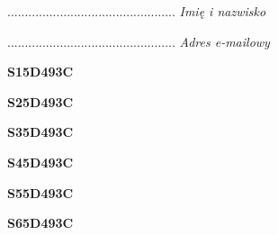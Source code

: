 \begin{turn}{90}\begin{minipage}{\linewidth} \vspace{20mm} ................................................  \textit{Imię i nazwisko}\end{minipage}\end{turn}

\begin{turn}{90}\begin{minipage}{\linewidth} \vspace{20mm} ................................................  \textit{Adres e-mailowy}\end{minipage}\end{turn}

\begin{turn}{90}\huge \begin{minipage}{\linewidth} \vspace{10mm}\textbf{S15D493C}\end{minipage}\end{turn}

\begin{turn}{90}\huge \begin{minipage}{\linewidth} \vspace{10mm}\textbf{S25D493C}\end{minipage}\end{turn}

\begin{turn}{90}\huge \begin{minipage}{\linewidth} \vspace{10mm}\textbf{S35D493C}\end{minipage}\end{turn}

\begin{turn}{90}\huge \begin{minipage}{\linewidth} \vspace{10mm}\textbf{S45D493C}\end{minipage}\end{turn}

\begin{turn}{90}\huge \begin{minipage}{\linewidth} \vspace{10mm}\textbf{S55D493C}\end{minipage}\end{turn}

\begin{turn}{90}\huge \begin{minipage}{\linewidth} \vspace{10mm}\textbf{S65D493C}\end{minipage}\end{turn}

